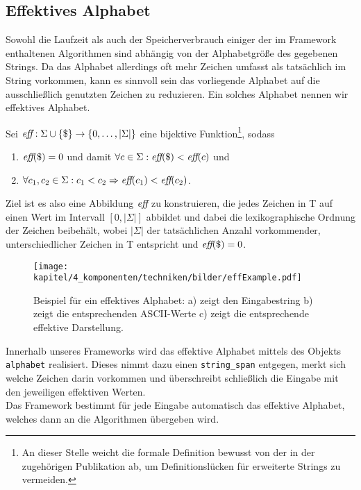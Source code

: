 \subsection{Effektives Alphabet}
\label{section:effalphabet}
Sowohl  die Laufzeit als auch der Speicherverbrauch einiger der im Framework enthaltenen Algorithmen sind abhängig von der Alphabetgröße des gegebenen Strings. Da das Alphabet allerdings oft mehr Zeichen umfasst als tatsächlich im String vorkommen, kann es sinnvoll sein das vorliegende Alphabet auf die ausschließlich genutzten Zeichen zu reduzieren. Ein solches Alphabet nennen wir effektives Alphabet.\par
\begin{definition}
	\label{def:effective_alphabet}
	Sei \(\textit{eff} : \Sigma \cup \{\$\} \rightarrow \{0, \ldots, |\Sigma|\}\) eine bijektive Funktion\footnote{\label{differs_from_paper}An dieser Stelle weicht die formale Definition bewusst von der in der zugehörigen Publikation \cite{saca:2} ab, um Definitionslücken für erweiterte Strings zu vermeiden.}, sodass
	\begin{enumerate}
		\item \(\textit{eff}(\$) = 0\) \quad und damit \(\forall c \in \Sigma : \textit{eff}(\$) < \textit{eff}(c)\) und
		\item \(\forall c_1, c_2 \in \Sigma : c_1 < c_2 \Rightarrow \textit{eff}(c_1) < \textit{eff}(c_2)\).
	\end{enumerate}
\end{definition}
Ziel ist es also eine Abbildung $\textit{eff}$ zu konstruieren, die jedes Zeichen in T auf einen Wert im Intervall $[0,|\Sigma|]$ abbildet und dabei die lexikographische Ordnung der Zeichen beibehält, wobei $|\Sigma|$ der tatsächlichen Anzahl vorkommender, unterschiedlicher Zeichen in T entspricht und $\textit{eff}(\$)=0$.\\

\begin{figure}[h]
\centering
\texttt{[image: kapitel/4\_komponenten/techniken/bilder/effExample.pdf]}
\caption{Beispiel für ein effektives Alphabet: a) zeigt den Eingabestring b) zeigt die entsprechenden ASCII-Werte c) zeigt die entsprechende effektive Darstellung.}
\end{figure}
Innerhalb unseres Frameworks wird das effektive Alphabet mittels des Objekts \texttt{alphabet} realisiert. Dieses nimmt dazu einen \texttt{string_span} entgegen, merkt sich welche Zeichen darin vorkommen und überschreibt schließlich die Eingabe mit den jeweiligen effektiven Werten. \\
Das Framework bestimmt für jede Eingabe automatisch das effektive Alphabet, welches dann an die Algorithmen übergeben wird. 
